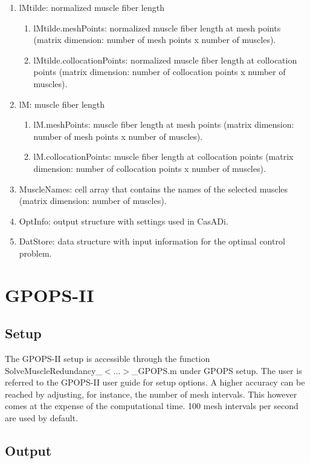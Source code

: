\documentclass[a4paper,oneside,11pt]{article}
\begin{document}
\begin{enumerate}
\begin{enumerate}
	\end{enumerate}	
	\item lMtilde: normalized muscle fiber length 
	\begin{enumerate}
	\item lMtilde.meshPoints: normalized muscle fiber length at mesh points (matrix dimension: number of mesh points x number of muscles).
	\item lMtilde.collocationPoints: normalized muscle fiber length at collocation points (matrix dimension: number of collocation points x number of muscles). 
	\end{enumerate}	
	\item lM: muscle fiber length
	\begin{enumerate}
	\item lM.meshPoints: muscle fiber length at mesh points (matrix dimension: number of mesh points x number of muscles).
	\item lM.collocationPoints: muscle fiber length at collocation points (matrix dimension: number of collocation points x number of muscles). 
	\end{enumerate}	
	\item MuscleNames: cell array that contains the names of the selected muscles (matrix dimension: number of muscles).
	\item OptInfo: output structure with settings used in CasADi.
	\item DatStore: data structure with input information for the optimal control problem.
\end{enumerate}


\section{GPOPS-II}
\subsection{Setup}

The GPOPS-II setup is accessible through the function SolveMuscleRedundancy_$<...>$_GPOPS.m under GPOPS setup. The user is referred to the GPOPS-II user guide for setup options. A higher accuracy can be reached by adjusting, for instance, the number of mesh intervals. This however comes at the expense of the computational time. 100 mesh intervals per second are used by default.

\subsection{Output}
\end{document}
